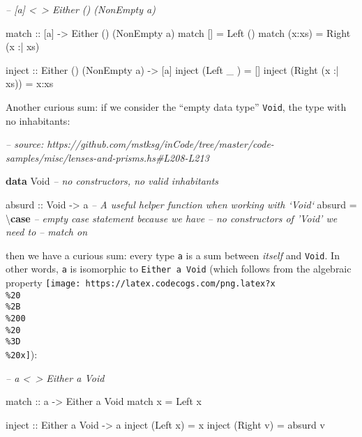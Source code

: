 \documentclass[]{article}
\newenvironment{Shaded}{}{}
\newcommand{\CommentTok}[1]{\textcolor[rgb]{0.38,0.63,0.69}{\textit{#1}}}
\newcommand{\DataTypeTok}[1]{\textcolor[rgb]{0.56,0.13,0.00}{#1}}
\newcommand{\FunctionTok}[1]{\textcolor[rgb]{0.02,0.16,0.49}{#1}}
\newcommand{\KeywordTok}[1]{\textcolor[rgb]{0.00,0.44,0.13}{\textbf{#1}}}
\newcommand{\NormalTok}[1]{#1}
\newcommand{\OtherTok}[1]{\textcolor[rgb]{0.00,0.44,0.13}{#1}}
\begin{document}
\begin{Shaded}
\begin{Highlighting}[]
\CommentTok{-- [a] <~> Either () (NonEmpty a)}

\OtherTok{match ::}\NormalTok{ [a] }\OtherTok{->} \DataTypeTok{Either}\NormalTok{ () (}\DataTypeTok{NonEmpty}\NormalTok{ a)}
\NormalTok{match []     }\FunctionTok{=} \DataTypeTok{Left}\NormalTok{  ()}
\NormalTok{match (x}\FunctionTok{:}\NormalTok{xs) }\FunctionTok{=} \DataTypeTok{Right}\NormalTok{ (x }\FunctionTok{:|}\NormalTok{ xs)}

\OtherTok{inject ::} \DataTypeTok{Either}\NormalTok{ () (}\DataTypeTok{NonEmpty}\NormalTok{ a) }\OtherTok{->}\NormalTok{ [a]}
\NormalTok{inject (}\DataTypeTok{Left}\NormalTok{   _       ) }\FunctionTok{=}\NormalTok{ []}
\NormalTok{inject (}\DataTypeTok{Right}\NormalTok{ (x }\FunctionTok{:|}\NormalTok{ xs)) }\FunctionTok{=}\NormalTok{ x}\FunctionTok{:}\NormalTok{xs}
\end{Highlighting}
\end{Shaded}

Another curious sum: if we consider the ``empty data type'' \texttt{Void}, the
type with no inhabitants:

\begin{Shaded}
\begin{Highlighting}[]
\CommentTok{-- source: https://github.com/mstksg/inCode/tree/master/code-samples/misc/lenses-and-prisms.hs#L208-L213}

\KeywordTok{data} \DataTypeTok{Void}           \CommentTok{-- no constructors, no valid inhabitants}

\OtherTok{absurd ::} \DataTypeTok{Void} \OtherTok{->}\NormalTok{ a     }\CommentTok{-- A useful helper function when working with `Void`}
\NormalTok{absurd }\FunctionTok{=}\NormalTok{ \textbackslash{}}\KeywordTok{case} \CommentTok{-- empty case statement because we have}
               \CommentTok{-- no constructors of 'Void' we need to}
               \CommentTok{-- match on}
\end{Highlighting}
\end{Shaded}

then we have a curious sum: every type \texttt{a} is a sum between \emph{itself}
and \texttt{Void}. In other words, \texttt{a} is isomorphic to
\texttt{Either\ a\ Void} (which follows from the algebraic property
\texttt{[image: https://latex.codecogs.com/png.latex?x\\\%20\\\%2B\\\%200\\\%20\\\%3D\\\%20x]}):

\begin{Shaded}
\begin{Highlighting}[]
\CommentTok{-- a <~> Either a Void}

\OtherTok{match ::}\NormalTok{ a }\OtherTok{->} \DataTypeTok{Either}\NormalTok{ a }\DataTypeTok{Void}
\NormalTok{match x }\FunctionTok{=} \DataTypeTok{Left}\NormalTok{ x}

\OtherTok{inject ::} \DataTypeTok{Either}\NormalTok{ a }\DataTypeTok{Void} \OtherTok{->}\NormalTok{ a}
\NormalTok{inject (}\DataTypeTok{Left}\NormalTok{  x) }\FunctionTok{=}\NormalTok{ x}
\NormalTok{inject (}\DataTypeTok{Right}\NormalTok{ v) }\FunctionTok{=}\NormalTok{ absurd v}
\end{Highlighting}
\end{Shaded}
\end{document}
